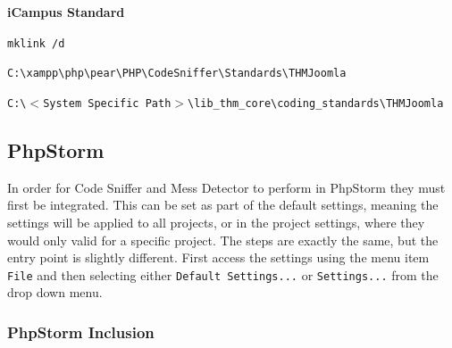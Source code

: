 \documentclass[]{report}
\begin{document}
\noindent
\textbf{iCampus Standard}
\begin{description}
	\itemsep-10pt
	\item[Command] \texttt{mklink /d}\\
	\item[Link] \texttt{C:\textbackslash xampp\textbackslash php\textbackslash pear\textbackslash PHP\textbackslash CodeSniffer\textbackslash Standards\textbackslash THMJoomla}\\
	\item[Target] \texttt{C:\textbackslash $<$System Specific Path$>$\textbackslash lib\_thm\_core\textbackslash coding\_standards\textbackslash THMJoomla}\\
\end{description}

\newpage

\subsection{PhpStorm}

In order for Code Sniffer and Mess Detector to perform in PhpStorm they must first be integrated. This can be set as part of the default settings, meaning the settings will be applied to all projects, or in the project settings, where they would only valid for a specific project. The steps are exactly the same, but the entry point is slightly different. First access the settings using the menu item \texttt{File} and then selecting either \texttt{Default Settings...} or \texttt{Settings...} from the drop down menu.

\subsubsection{PhpStorm Inclusion}
\end{document}
